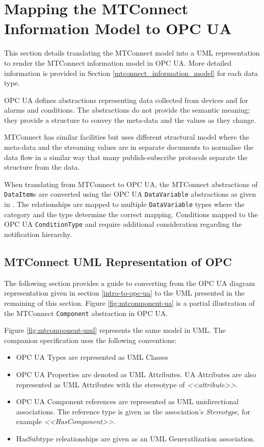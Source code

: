 \section{Mapping the MTConnect Information Model to OPC UA} 
  \label{mtconnect-mapping}

This section details translating the MTConnect model into a UML representation to render the MTConnect information model in OPC UA. More detailed information is provided in Section \ref{mtconnect_information_model} for each data type.

OPC UA defines abstractions representing data collected from devices and for alarms and conditions. The abstractions do not provide the semantic meaning; they provide a structure to convey the meta-data and the values as they change. 

MTConnect has similar facilities but uses different structural model where the meta-data and the streaming values are in separate documents to normalise the data flow in a similar way that many publish-subscribe protocols separate the structure from the data.

When translating from MTConnect to OPC UA, the MTConnect abstractions of \texttt{Data\-Item}s are converted using the OPC UA  \texttt{Data\-Variable} abstractions as given in \cite{UAPart8}.  The relationships are mapped to multiple \texttt{DataVariable} types where the category and the type determine the correct mapping. Conditions mapped to the OPC UA \texttt{ConditionType} and require additional consideration regarding the notification hierarchy. 

\subsection{MTConnect UML Representation of OPC}

The following section provides a guide to converting from the OPC UA diagram representation given in section \ref{intro-to-opc-ua} to the UML presented in the remaining of this section. Figure \ref{fig:mtcomponent-ua} is a partial illustration of the MTConnect \texttt{Component} abstraction in OPC UA.



Figure \ref{fig:mtcomponent-uml} represents the same model in UML. The companion specification uses the following conventions:

\begin{itemize}
\item OPC UA Types are represented as UML Classes
\item OPC UA Properties are denoted as UML Attributes. UA Attributes are also represented as UML Attributes with the stereotype of \textit{<<attribute>>}.
\item OPC UA Component references are represented as UML unidirectional associations. The reference type is given as the association's \textit{Stereotype}, for example \textit{<<HasComponent>>}. 
\item HasSubtype releationships are given as an UML Generatlization association.  
\end{itemize}

